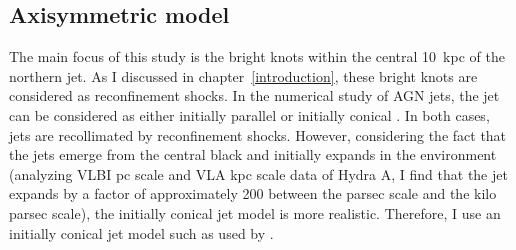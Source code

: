 \subsection{Axisymmetric model}
The main focus of this study is the bright knots within the central 10~kpc of the northern jet. As I discussed in chapter~\ref{introduction}, these bright knots are considered as reconfinement shocks. In the numerical study of AGN jets, the jet can be considered as either initially parallel \citep{sutherland07} or initially conical \citep{komissarov98, krause12}. In both cases, jets are recollimated by reconfinement shocks. However, considering the fact that the jets emerge from the central black and initially expands in the environment (analyzing VLBI pc scale \citep{taylor96} and VLA kpc scale \citep{taylor90} data of Hydra A, I find that the jet expands by a factor of approximately 200 between the parsec scale and the kilo parsec scale), the initially conical jet model is more realistic. Therefore, I use an initially conical jet model such as used by \citet{komissarov98}. 



